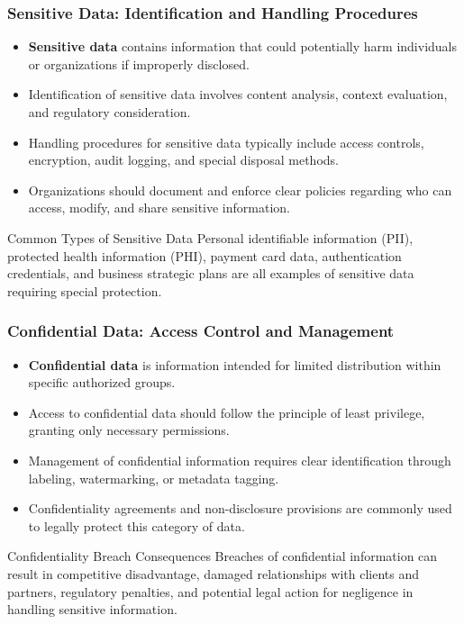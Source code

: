 \documentclass{beamer}
\begin{document}
\begin{frame}
\frametitle{Sensitive Data: Identification and Handling Procedures}
\begin{itemize}
\item \textbf{Sensitive data} contains information that could potentially harm individuals or organizations if improperly disclosed.
\item Identification of sensitive data involves content analysis, context evaluation, and regulatory consideration.
\item Handling procedures for sensitive data typically include access controls, encryption, audit logging, and special disposal methods.
\item Organizations should document and enforce clear policies regarding who can access, modify, and share sensitive information.
\end{itemize}

\begin{exampleblock}{Common Types of Sensitive Data}
Personal identifiable information (PII), protected health information (PHI), payment card data, authentication credentials, and business strategic plans are all examples of sensitive data requiring special protection.
\end{exampleblock}
\end{frame}

\begin{frame}
\frametitle{Confidential Data: Access Control and Management}
\begin{itemize}
\item \textbf{Confidential data} is information intended for limited distribution within specific authorized groups.
\item Access to confidential data should follow the principle of least privilege, granting only necessary permissions.
\item Management of confidential information requires clear identification through labeling, watermarking, or metadata tagging.
\item Confidentiality agreements and non-disclosure provisions are commonly used to legally protect this category of data.
\end{itemize}

\begin{alertblock}{Confidentiality Breach Consequences}
Breaches of confidential information can result in competitive disadvantage, damaged relationships with clients and partners, regulatory penalties, and potential legal action for negligence in handling sensitive information.
\end{alertblock}
\end{frame}
\end{document}
